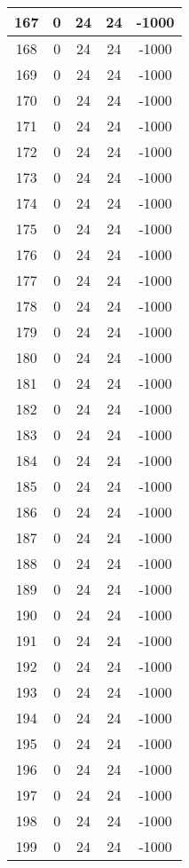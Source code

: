 \documentclass[letterpaper, 12pt]{article}
\begin{document}
\begin{longtable}{|c|c|c|c|c|}
\hline
167 & 0 & 24 & 24 & -1000 \\
\hline
168 & 0 & 24 & 24 & -1000 \\
\hline
169 & 0 & 24 & 24 & -1000 \\
\hline
170 & 0 & 24 & 24 & -1000 \\
\hline
171 & 0 & 24 & 24 & -1000 \\
\hline
172 & 0 & 24 & 24 & -1000 \\
\hline
173 & 0 & 24 & 24 & -1000 \\
\hline
174 & 0 & 24 & 24 & -1000 \\
\hline
175 & 0 & 24 & 24 & -1000 \\
\hline
176 & 0 & 24 & 24 & -1000 \\
\hline
177 & 0 & 24 & 24 & -1000 \\
\hline
178 & 0 & 24 & 24 & -1000 \\
\hline
179 & 0 & 24 & 24 & -1000 \\
\hline
180 & 0 & 24 & 24 & -1000 \\
\hline
181 & 0 & 24 & 24 & -1000 \\
\hline
182 & 0 & 24 & 24 & -1000 \\
\hline
183 & 0 & 24 & 24 & -1000 \\
\hline
184 & 0 & 24 & 24 & -1000 \\
\hline
185 & 0 & 24 & 24 & -1000 \\
\hline
186 & 0 & 24 & 24 & -1000 \\
\hline
187 & 0 & 24 & 24 & -1000 \\
\hline
188 & 0 & 24 & 24 & -1000 \\
\hline
189 & 0 & 24 & 24 & -1000 \\
\hline
190 & 0 & 24 & 24 & -1000 \\
\hline
191 & 0 & 24 & 24 & -1000 \\
\hline
192 & 0 & 24 & 24 & -1000 \\
\hline
193 & 0 & 24 & 24 & -1000 \\
\hline
194 & 0 & 24 & 24 & -1000 \\
\hline
195 & 0 & 24 & 24 & -1000 \\
\hline
196 & 0 & 24 & 24 & -1000 \\
\hline
197 & 0 & 24 & 24 & -1000 \\
\hline
198 & 0 & 24 & 24 & -1000 \\
\hline
199 & 0 & 24 & 24 & -1000 \\
\hline
\end{longtable}
\end{document}
